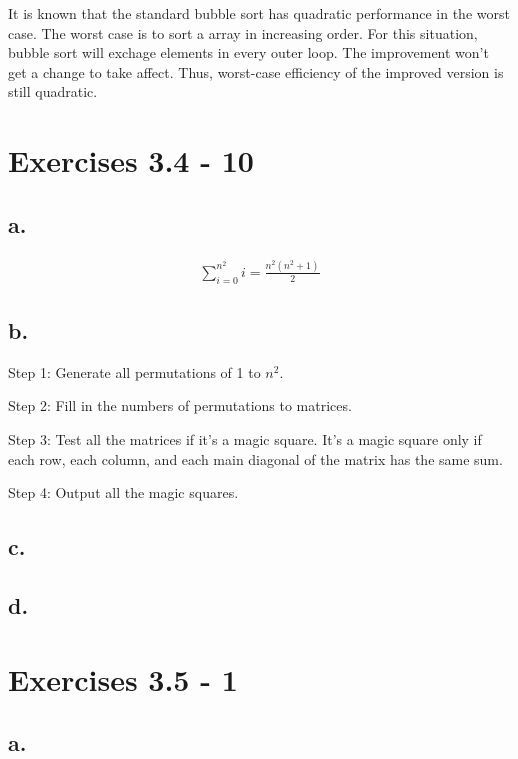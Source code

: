\documentclass{article}
\begin{document}
It is known that the standard bubble sort has quadratic performance in the worst case. The worst case is to sort a array in increasing order. For this situation, bubble sort will exchage elements in every outer loop. The improvement won't get a change to take affect. Thus, worst-case efficiency of the improved version is still quadratic.

\section{Exercises 3.4 - 10}

\subsection{a.}

\begin{align*}
\sum_{i=0}^{n^2}i = \frac{n^2(n^2+1)}{2}
\end{align*}

\subsection{b.}

Step 1: Generate all permutations of 1 to $n^2$.

Step 2: Fill in the numbers of permutations to matrices.

Step 3: Test all the matrices if it's a magic square. It's a magic square only if each row, each column, and each main diagonal of the matrix has the same sum.

Step 4: Output all the magic squares.

\subsection{c.}



\subsection{d.}

\section{Exercises 3.5 - 1}

\subsection{a.}
\end{document}
